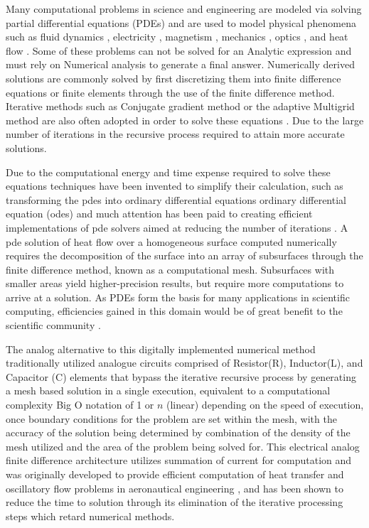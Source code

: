 \par Many computational problems in science and engineering are modeled via solving partial differential equations (PDEs) and are used to model physical phenomena such as fluid dynamics \cite{Isom_H._2008}, electricity \cite{M.Sadiku_1990}, magnetism \cite{H.Berestycki_2002}, mechanics \cite{A.Selvadurai_2000}, optics \cite{C.Tang_2013}, and heat flow \cite{rocca2015entropic}. Some of these problems can not be solved for an \gls{Analytic expression} and must rely on \gls{Numerical analysis} to generate a final answer. Numerically derived solutions are commonly solved by first discretizing them into finite difference equations or finite elements through the use of the \gls{finite difference method}. Iterative methods such as \gls{Conjugate gradient method} or the adaptive \gls{Multigrid method} are also often adopted in order to solve these equations \cite{richter2015memristive}. Due to the large number of iterations in the recursive process required to attain more accurate solutions.

\par Due to the computational energy and time expense required to solve these equations techniques have been invented to simplify their calculation, such as transforming the \acrshort{pde}s into ordinary differential equations \gls{ordinary differential equation} (\acrshort{ode}s) and much attention has been paid to creating efficient implementations of \acrshort{pde} solvers aimed at reducing the number of iterations \cite{J.Zhu_1994, L.Pinuel_1998}. A \acrshort{pde} solution of heat flow over a homogeneous surface computed numerically requires the decomposition of the surface into an array of subsurfaces through the finite difference method, known as a computational mesh.  Subsurfaces with smaller areas yield higher-precision results, but require more computations to arrive at a solution. As PDEs form the basis for many applications in scientific computing, efficiencies gained in this domain would be of great benefit to the scientific community \cite{J.Dongarra_2017}.

\par The analog alternative to this digitally implemented numerical method traditionally utilized analogue circuits comprised of Resistor(R), Inductor(L), and Capacitor (C) elements that bypass the iterative recursive process by generating a mesh based solution in a single execution, equivalent to a computational complexity \gls{Big O notation} of 1 or $n$ (linear) depending on the speed of execution, once boundary conditions for the problem are set within the mesh, with the accuracy of the solution being determined by combination of the density of the mesh utilized and the area of the problem being solved for. This electrical analog finite difference architecture utilizes summation of current for computation and  was originally developed to provide efficient computation of heat transfer \cite{G.Liebmann_1950} and oscillatory flow problems in aeronautical engineering \cite{P.Palmer_1959}, and has been shown to reduce the time to solution through its elimination of the iterative processing steps which retard numerical methods.

